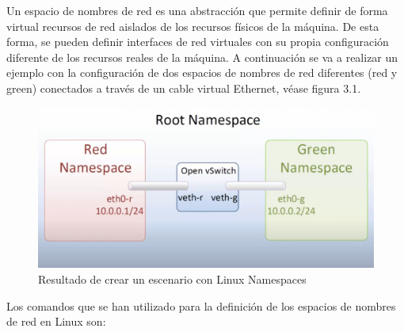 \documentclass[a4paper, 12pt]{book}
\begin{document}
	Un espacio de nombres de red es una abstracción que permite definir de forma virtual recursos de red
	aislados de los recursos físicos de la máquina. De esta forma, se pueden definir interfaces de red virtuales
	con su propia configuración diferente de los recursos reales de la máquina. A continuación se va a
	realizar un ejemplo con la configuración de dos espacios de nombres de red diferentes (red y green)
	conectados a través de un cable virtual Ethernet, véase figura 3.1.

	\begin{figure}[H]
		\centering
		\includegraphics[width=14cm, keepaspectratio]{img/Linux namespaces}
		\caption{Resultado de crear un escenario con Linux Namespaces}
		\label{figura:linux_namespaces}
	\end{figure}
	
	Los comandos que se han utilizado para la definición de los espacios de nombres de red en Linux son:
	
\end{document}
